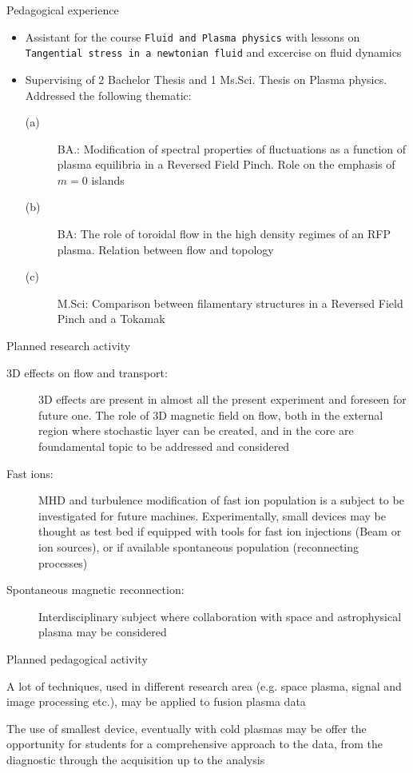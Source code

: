 \documentclass[t,10pt]{beamer}
\begin{document}
\begin{frame}{Pedagogical experience}
\begin{itemize}
\item Assistant for the course \texttt{Fluid and Plasma physics} with
  lessons on \texttt{Tangential stress in a newtonian fluid} and
  excercise on fluid dynamics
\item Supervising of 2 Bachelor Thesis and 1 Ms.Sci. Thesis on Plasma
  physics. Addressed the following thematic:
\begin{description}
\item[(a)] BA.: Modification of spectral properties of fluctuations as a
  function of plasma equilibria in a Reversed Field Pinch. Role on the
  emphasis of $m=0$ islands
\item[(b)] BA: The role of toroidal flow in the high density regimes
  of an RFP plasma. Relation between flow and topology
\item[(c)] M.Sci: Comparison between filamentary structures in a
  Reversed Field Pinch and a Tokamak
\end{description}
\end{itemize}
\end{frame}

\begin{frame}{Planned research activity}
\begin{description}
\item[3D effects on flow and transport:] 3D effects are
  present in almost all the present experiment and foreseen for future
  one. The role of 3D magnetic field on flow, both in the external
  region where stochastic layer can be created, and in the core are
  foundamental topic to be addressed and considered
\item[Fast ions:] MHD and turbulence modification of fast ion
  population is a subject to be investigated for future
  machines. Experimentally, small devices may be thought as test bed
  if equipped with tools for fast ion injections (Beam or ion
  sources), or if available spontaneous population (reconnecting processes)
\item[Spontaneous magnetic reconnection:] Interdisciplinary subject
  where collaboration with space and astrophysical plasma may be considered 
\end{description}
\end{frame}

\begin{frame}{Planned pedagogical activity}
\begin{description}
{\large \item[Multidisciplinary approach to data analysis:] A lot of
  techniques, used in different research area (e.g. space plasma,
  signal and image processing etc.), may be applied to
  fusion plasma data}
{\large\item[Small fusion device as learning tools:] The use of smallest
  device, eventually with cold plasmas may be offer the opportunity
  for students for a comprehensive approach to the data, from the
  diagnostic through the acquisition up to the analysis }
\end{description}
\end{frame}
\end{document}
